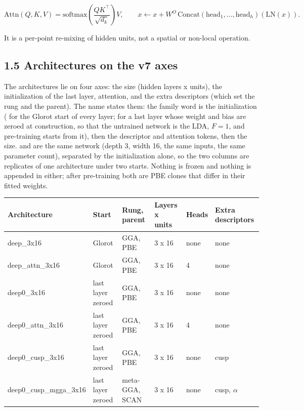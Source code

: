 \documentclass[10pt,a4paper]{article}
\begin{document}
\[
\mathrm{Attn}(Q, K, V) = \mathrm{softmax}\!\left(\frac{QK^{\top}}{\sqrt{d_k}}\right) V, \qquad
x \leftarrow x + W^{O}\,\mathrm{Concat}(\mathrm{head}_1, \ldots, \mathrm{head}_h)(\mathrm{LN}(x)).
\]

It is a per-point re-mixing of hidden units, not a spatial or non-local operation.

\subsection*{1.5 Architectures on the v7 axes}

The architectures lie on four axes: the size (hidden layers x units), the initialization of the last layer, attention, and the extra descriptors (which set the rung and the parent). The name states them: the family word is the initialization ( for the Glorot start of every layer;  for a last layer whose weight and bias are zeroed at construction, so that the untrained network is the LDA, $F = 1$, and pre-training starts from it), then the descriptor and attention tokens, then the size.  and  are the same network (depth 3, width 16, the same inputs, the same parameter count), separated by the initialization alone, so the two columns are replicates of one architecture under two starts. Nothing is frozen and nothing is appended in either; after pre-training both are PBE clones that differ in their fitted weights.

\begin{landscape}
\begin{footnotesize}
\begin{longtable}{llllll}
\toprule Architecture & Start & Rung, parent & Layers x units & Heads & Extra descriptors \\ \midrule \endhead
deep\_3x16 & Glorot & GGA, PBE & 3 x 16 & none & none \\
deep\_attn\_3x16 & Glorot & GGA, PBE & 3 x 16 & 4 & none \\
deep0\_3x16 & last layer zeroed & GGA, PBE & 3 x 16 & none & none \\
deep0\_attn\_3x16 & last layer zeroed & GGA, PBE & 3 x 16 & 4 & none \\
deep0\_cusp\_3x16 & last layer zeroed & GGA, PBE & 3 x 16 & none & cusp \\
deep0\_cusp\_mgga\_3x16 & last layer zeroed & meta-GGA, SCAN & 3 x 16 & none & cusp, $\alpha$ \\
\bottomrule \end{longtable}
\end{footnotesize}
\end{landscape}
\end{document}
